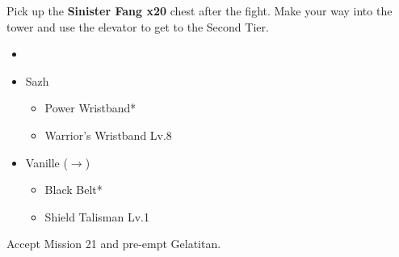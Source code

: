 Pick up the \textbf{Sinister Fang x20} chest after the fight.
Make your way into the tower and use the elevator to get to the Second Tier.

\begin{menu}
	\begin{itemize}
		\paradigm
		\begin{itemize}
			\item {}%
				  {\paradigmline{(\syn)}{\sab}{(\com)}}%
			      {\paradigmline{\com}{\rav}{\rav}}%
			      {\paradigmline[4]{\syn}{(\sab)}{(\rav)}}%
			      {\paradigmline{\com}{(\rav)}{\com}}%
			      {\paradigmline{\rav}{\sab}{(\rav)}}%
			      {\paradigmline{\com}{\med}{\com}}%
		\end{itemize}
		\equip
		\begin{itemize}
			\item Sazh
				\begin{itemize}
					\item Power Wristband*
					\item Warrior's Wristband Lv.8
				\end{itemize}
			\item Vanille ($\rightarrow$)
				\begin{itemize}
					\item Black Belt*
					\item Shield Talisman Lv.1
				\end{itemize}
		\end{itemize}
	\end{itemize}
\end{menu}

\renewcommand{\first}{[1] Bully (\syn/\sab/\com)}
\renewcommand{\second}{[2] Relentless Assault (\com/\rav/\rav)}
\renewcommand{\third}{[3] Guerilla (\syn/\sab/\rav)}
\renewcommand{\fourth}{[4] Aggression (\com/\rav/\com)}
\renewcommand{\fifth}{[5] Smart Bomb (\rav/\sab/\rav)}
\renewcommand{\sixth}{[6] Tireless Charge (\com/\med/\com)}

Accept Mission 21 and pre-empt Gelatitan.

